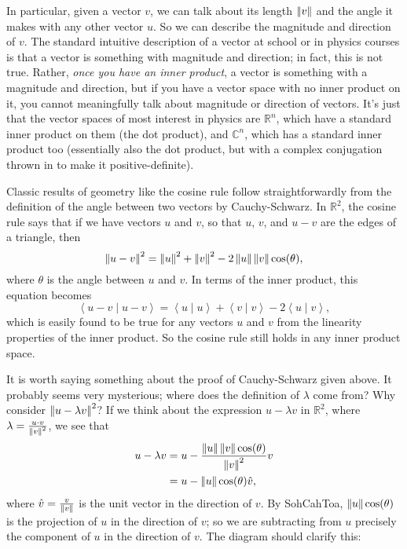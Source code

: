 \documentclass{article}
\newcommand{\norm}[1]{\left|\kern-1pt\left|#1\right|\kern-1pt\right|}
\newcommand{\braket}[2]{\left\langle #1 \mid #2 \right\rangle}
\begin{document}
In particular, given a vector $v$, we can talk about its length $\norm{v}$ and the angle it makes with any other vector $u$. So we can describe the magnitude and direction of $v$. The standard intuitive description of a vector at school or in physics courses is that a vector is something with magnitude and direction; in fact, this is not true. Rather, \textit{once you have an inner product}, a vector is something with a magnitude and direction, but if you have a vector space with no inner product on it, you cannot meaningfully talk about magnitude or direction of vectors. It's just that the vector spaces of most interest in physics are $\mathbb{R}^n$, which have a standard inner product on them (the dot product), and $\mathbb{C}^n$, which has a standard inner product too (essentially also the dot product, but with a complex conjugation thrown in to make it positive-definite).\bigskip


Classic results of geometry like the cosine rule follow straightforwardly from the definition of the angle between two vectors by Cauchy-Schwarz. In $\mathbb{R}^2$, the cosine rule says that if we have vectors $u$ and $v$, so that $u$, $v$, and $u-v$ are the edges of a triangle, then
\[\norm{u-v}^2=\norm{u}^2+\norm{v}^2-2\norm{u}\norm{v}\cos(\theta),\]
where $\theta$ is the angle between $u$ and $v$. In terms of the inner product, this equation becomes
\[\braket{u-v}{u-v}=\braket{u}{u}+\braket{v}{v}-2\braket{u}{v},\]
which is easily found to be true for any vectors $u$ and $v$ from the linearity properties of the inner product. So the cosine rule still holds in any inner product space.\bigskip


It is worth saying something about the proof of Cauchy-Schwarz given above. It probably seems very mysterious; where does the definition of $\lambda$ come from? Why consider $\norm{u-\lambda v}^2$? If we think about the expression $u-\lambda v$ in $\mathbb{R}^2$, where $\lambda=\frac{u\cdot v}{\norm{v}^2}$, we see that 
\begin{align*}
	u-\lambda v &= u-\frac{\norm{u}\norm{v}\cos(\theta)}{\norm{v}^2}v\\
	&=u-\norm{u}\cos(\theta)\hat{v},
\end{align*}
where $\hat{v}=\frac{v}{\norm{v}}$ is the unit vector in the direction of $v$. By SohCahToa, $\norm{u}\cos(\theta)$ is the projection of $u$ in the direction of $v$; so we are subtracting from $u$ precisely the component of $u$ in the direction of $v$. The diagram should clarify this:
\end{document}

